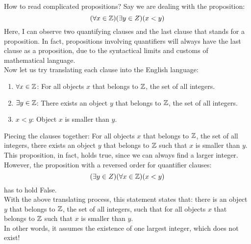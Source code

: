 \begin{ln-think}{How to read complicated propositions?}{}
    Say we are dealing with the proposition:
    \[(\forall x \in \mathbb{Z})(\exists y \in Z)(x < y)\]
    Here, I can observe two quantifying clauses and the last clause that stands for a proposition. In fact, propositions involving quantifiers will always have the last clause as a proposition, due to the syntactical limits and customs of mathematical language. \\
    Now let us try translating each clause into the English language:
    \begin{enumerate}
        \item $\forall x \in \mathbb{Z}$: For all objects $x$ that belongs to $\mathbb{Z}$, the set of all integers.
        \item $\exists y \in \mathbb{Z}$: There exists an object $y$ that belongs to $\mathbb{Z}$, the set of all integers.
        \item $x < y$: Object $x$ is smaller than $y$.
    \end{enumerate}
    Piecing the clauses together: For all objects $x$ that belongs to $\mathbb{Z}$, the set of all integers, there exists an object $y$ that belongs to $\mathbb{Z}$ such that $x$ is smaller than $y$. \\
    This proposition, in fact, holds true, since we can always find a larger integer. \\
    However, the proposition with a reversed order for quantifier clauses:
    \[(\exists y \in Z)(\forall x \in \mathbb{Z})(x < y)\]
    has to hold False. \\

    With the above translating process, this statement states that: there is an object $y$ that belongs to $\mathbb{Z}$, the set of all integers, such that for all objects $x$ that belongs to $\mathbb{Z}$ such that $x$ is smaller than $y$. \\
    In other words, it assumes the existence of one largest integer, which does not exist!
\end{ln-think}

